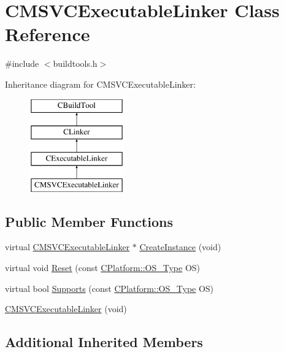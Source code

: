 \hypertarget{classCMSVCExecutableLinker}{\section{C\-M\-S\-V\-C\-Executable\-Linker Class Reference}
\label{classCMSVCExecutableLinker}
}


{\ttfamily \#include $<$buildtools.\-h$>$}

Inheritance diagram for C\-M\-S\-V\-C\-Executable\-Linker\-:\begin{figure}[H]
\begin{center}
\leavevmode
\includegraphics[height=4.000000cm]{db/dce/classCMSVCExecutableLinker}
\end{center}
\end{figure}
\subsection*{Public Member Functions}
\begin{DoxyCompactItemize}
\item 
virtual \hyperlink{classCMSVCExecutableLinker}{C\-M\-S\-V\-C\-Executable\-Linker} $\ast$ \hyperlink{classCMSVCExecutableLinker_ad5b1391fa863f9e966562ee227a00693}{Create\-Instance} (void)
\item 
virtual void \hyperlink{classCMSVCExecutableLinker_aec2b90e8609888c052952a2072d65f52}{Reset} (const \hyperlink{classCPlatform_a2fb735c63c53052f79629e338bb0f535}{C\-Platform\-::\-O\-S\-\_\-\-Type} O\-S)
\item 
virtual bool \hyperlink{classCMSVCExecutableLinker_ab29c9d52020b0fcdf8a8a2affd8d48e2}{Supports} (const \hyperlink{classCPlatform_a2fb735c63c53052f79629e338bb0f535}{C\-Platform\-::\-O\-S\-\_\-\-Type} O\-S)
\item 
\hyperlink{classCMSVCExecutableLinker_a1aaab86f4190f8b214299cdae29e826c}{C\-M\-S\-V\-C\-Executable\-Linker} (void)
\end{DoxyCompactItemize}
\subsection*{Additional Inherited Members}


